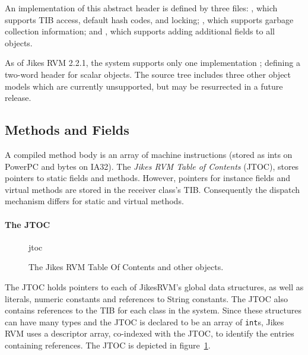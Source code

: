 An implementation of this abstract header is defined by three files: 
, which supports
TIB access, default hash codes, and locking; 
, which
supports garbage collection information; 
and 
, which supports
adding additional fields to all objects. 

As of Jikes RVM 2.2.1, the system supports only one implementation
; 
defining a two-word header for scalar objects.  The source tree includes
three other object models which are currently unsupported, but may be
resurrected in a future release.

\JavaTMFooter

\JikesTMFooter

\subsection{Methods and Fields}\label{sssec:methods}
A compiled method body is an array of machine instructions (stored as
ints on PowerPC and bytes on IA32). 
The {\em Jikes RVM Table of Contents} (JTOC),
stores pointers to static fields and methods.  However, 
pointers for instance fields and virtual methods are stored in the receiver 
class's TIB.  Consequently the dispatch mechanism differs for static and virtual 
methods.

\paragraph{The JTOC}
\begin{figure}[htb]
\begin{gif}{jtoc}
\vbox{
\hbox{}
}\hfil
\end{gif}
\caption{The Jikes RVM Table Of Contents and other objects.}
\label{fig:jtoc}
\end{figure}
The JTOC holds pointers to 
each of Jikes\trademark RVM's global data structures, as well as
literals, numeric constants and references to String constants.
The JTOC also
contains references to the TIB for each class in the system.  
Since these 
structures can have many types and the JTOC is declared to be an array of 
{\tt int}s,  
Jikes RVM uses a descriptor array, co-indexed with the JTOC, 
to identify the entries containing references.
The JTOC
is depicted in figure~\ref{fig:jtoc}.  

